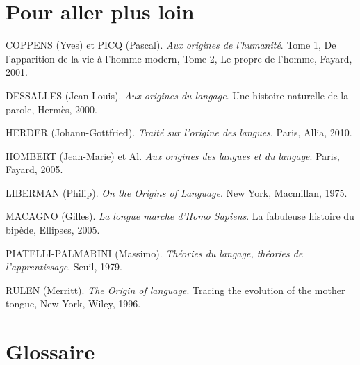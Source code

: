 \section*{Pour aller plus loin}
\begingroup\small\setlength{\parskip}{.15em}\setlength{\parindent}{-4mm}\leftskip=4mm
COPPENS (Yves) et PICQ (Pascal). \textit{Aux origines de l’humanité}. Tome 1, De l’apparition de la vie à l’homme modern, Tome 2, Le propre de l’homme, Fayard, 2001.

DESSALLES (Jean-Louis). \textit{Aux origines du langage}. Une histoire naturelle de la parole, Hermès, 2000.

HERDER (Johann-Gottfried). \textit{Traité sur l’origine des langues}. Paris, Allia, 2010.

HOMBERT (Jean-Marie) et Al. \textit{Aux origines des langues et du langage}. Paris, Fayard, 2005.

LIBERMAN (Philip). \textit{On the Origins of Language}. New York, Macmillan, 1975.

MACAGNO (Gilles). \textit{La longue marche d’Homo Sapiens}. La fabuleuse histoire du bipède, Ellipses, 2005.

PIATELLI-PALMARINI (Massimo). \textit{Théories du langage, théories de l’apprentissage}. Seuil, 1979.

RULEN (Merritt). \textit{The Origin of language}. Tracing the evolution of the mother tongue, New York, Wiley, 1996.
\par\endgroup
\clearpage
{}
\section*{Glossaire}
